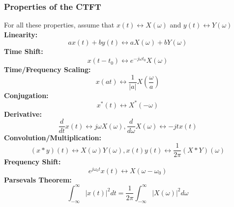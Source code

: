 \documentclass{article}
\begin{document}
\subsubsection{Properties of the CTFT}
For all these properties, assume that $x(t) \leftrightarrow X(\omega)$ and $y(t) \leftrightarrow Y(\omega)$\\
\textbf{Linearity: } 
$$ax(t) + by(t) \leftrightarrow aX(\omega) + bY(\omega)$$
\textbf{Time Shift: }
$$x(t-t_0) \leftrightarrow e^{-j\omega t_0}X(\omega)$$
\textbf{Time/Frequency Scaling: }
$$x(at) \leftrightarrow \frac{1}{|a|}X(\frac{\omega}{a})$$
\textbf{Conjugation: } 
$$x^*(t) \leftrightarrow X^*(-\omega)$$
\textbf{Derivative: } 
$$\frac{d}{dt}x(t) \leftrightarrow j\omega X(\omega), \frac{d}{d\omega}X(\omega) \leftrightarrow -jt x(t)$$
\textbf{Convolution/Multiplication: } 
$$(x*y)(t) \leftrightarrow X(\omega)Y(\omega), x(t)y(t) \leftrightarrow \frac{1}{2\pi}(X*Y)(\omega)$$
\textbf{Frequency Shift: } 
$$e^{j\omega_0 t}x(t) \leftrightarrow X(\omega - \omega_0)$$
\textbf{Parsevals Theorem: }
$$\int_{-\infty}^{\infty}{|x(t)|^2dt} = \frac{1}{2\pi}\int_{-\infty}^{\infty}{|X(\omega)|^2d\omega}$$
\end{document}
